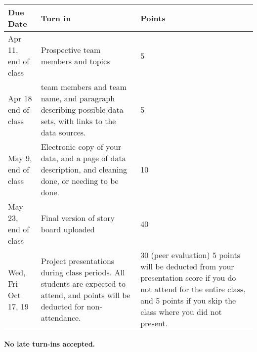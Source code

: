 \documentclass{article}
\begin{document}
\begin{center}
\bigskip
\begin{tabular}{|p{2cm}|p{8cm}|p{5cm}|}\hline
  {\bf Due Date} & {\bf Turn in}  & {\bf Points} \\\hline
Apr 11, end of class & Prospective team members and topics & 5 \\
Apr 18 end of class & team members and team name, and paragraph describing possible data sets, with links to the data sources.  & 5\\\hline
May 9, end of class & Electronic copy of your data, and a page of data description, and cleaning done, or needing to be done. & 10 \\\hline
May 23, end of class & Final version of story board uploaded & 40 \\\hline
Wed, Fri Oct 17, 19 & Project presentations during class periods. All students are expected to attend, and points will be deducted for non-attendance. & 30 (peer evaluation) 5 points will be deducted from your presentation score if you do not attend for the entire class, and 5 points if you skip the class where you did not present. \\\hline
\end{tabular}
\end{center}
\bigskip

{\bf No late turn-ins accepted.}
\end{document}
